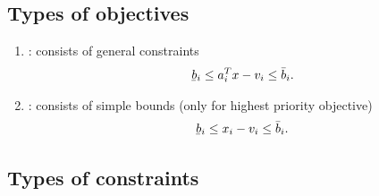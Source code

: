 \documentclass[12pt,a4paper]{article}
\newcommand{\ubar}[1]{\underaccent{\bar}{#1}}
\begin{document}
\subsection{Types of objectives}

\begin{enumerate}
\item {}: consists of general constraints
%
  \begin{align} \label{eq.ctr}
    \ubar{b}_i \leq a_i^Tx -v_i \leq \bar{b}_i.
  \end{align}

\item {}: consists of simple bounds (only for highest priority objective)
%
  \begin{align} \label{eq.simple_bounds}
    \ubar{b}_i \leq x_i - v_i \leq \bar{b}_i.
  \end{align}

\end{enumerate}

\subsection{Types of constraints}
\end{document}
